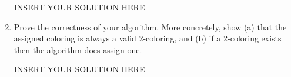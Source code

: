 \begin{enumerate}
\begin{solution}   INSERT YOUR SOLUTION HERE   \end{solution}

    \item Prove the correctness of your algorithm. More concretely, show (a) that the assigned coloring is always a valid 2-coloring, and (b) if a 2-coloring exists then the algorithm does assign one.
    
\begin{solution}   INSERT YOUR SOLUTION HERE   \end{solution}
\end{enumerate}
